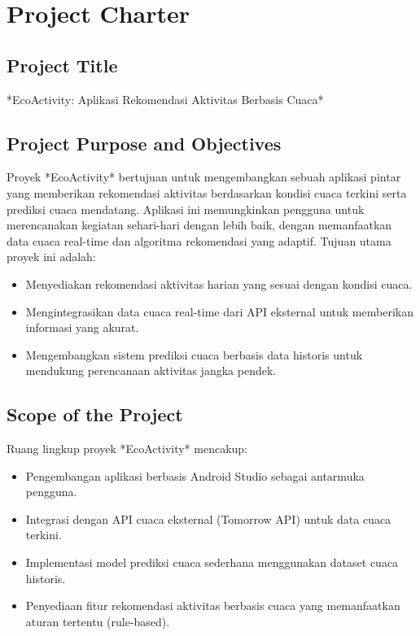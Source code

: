 \documentclass[journal,article,submit,pdftex,moreauthors]{Definitions/mdpi}
\begin{document}
\section{Project Charter}

\subsection{Project Title}
*EcoActivity: Aplikasi Rekomendasi Aktivitas Berbasis Cuaca*

\subsection{Project Purpose and Objectives}

Proyek *EcoActivity* bertujuan untuk mengembangkan sebuah aplikasi pintar yang memberikan rekomendasi aktivitas berdasarkan kondisi cuaca terkini serta prediksi cuaca mendatang. Aplikasi ini memungkinkan pengguna untuk merencanakan kegiatan sehari-hari dengan lebih baik, dengan memanfaatkan data cuaca real-time dan algoritma rekomendasi yang adaptif. Tujuan utama proyek ini adalah:
\begin{itemize}
    \item Menyediakan rekomendasi aktivitas harian yang sesuai dengan kondisi cuaca.
    \item Mengintegrasikan data cuaca real-time dari API eksternal untuk memberikan informasi yang akurat.
    \item Mengembangkan sistem prediksi cuaca berbasis data historis untuk mendukung perencanaan aktivitas jangka pendek.
\end{itemize}

\subsection{Scope of the Project}

Ruang lingkup proyek *EcoActivity* mencakup:
\begin{itemize}
    \item Pengembangan aplikasi berbasis Android Studio sebagai antarmuka pengguna.
    \item Integrasi dengan API cuaca eksternal (Tomorrow API) untuk data cuaca terkini.
    \item Implementasi model prediksi cuaca sederhana menggunakan dataset cuaca historis.
    \item Penyediaan fitur rekomendasi aktivitas berbasis cuaca yang memanfaatkan aturan tertentu (rule-based).
\end{itemize}
\end{document}
